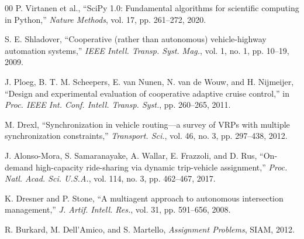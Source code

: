 \documentclass[conference]{IEEEtran}
\begin{document}
\begin{thebibliography}{00}
 P. Virtanen et al., ``SciPy 1.0: Fundamental algorithms for scientific computing in Python,'' \textit{Nature Methods}, vol. 17, pp. 261--272, 2020.

 S. E. Shladover, ``Cooperative (rather than autonomous) vehicle-highway automation systems,'' \textit{IEEE Intell. Transp. Syst. Mag.}, vol. 1, no. 1, pp. 10--19, 2009.

 J. Ploeg, B. T. M. Scheepers, E. van Nunen, N. van de Wouw, and H. Nijmeijer, ``Design and experimental evaluation of cooperative adaptive cruise control,'' in \textit{Proc. IEEE Int. Conf. Intell. Transp. Syst.}, pp. 260--265, 2011.

 M. Drexl, ``Synchronization in vehicle routing---a survey of VRPs with multiple synchronization constraints,'' \textit{Transport. Sci.}, vol. 46, no. 3, pp. 297--438, 2012.

 J. Alonso-Mora, S. Samaranayake, A. Wallar, E. Frazzoli, and D. Rus, ``On-demand high-capacity ride-sharing via dynamic trip-vehicle assignment,'' \textit{Proc. Natl. Acad. Sci. U.S.A.}, vol. 114, no. 3, pp. 462--467, 2017.

 K. Dresner and P. Stone, ``A multiagent approach to autonomous intersection management,'' \textit{J. Artif. Intell. Res.}, vol. 31, pp. 591--656, 2008.

 R. Burkard, M. Dell'Amico, and S. Martello, \textit{Assignment Problems}, SIAM, 2012.
\end{thebibliography}
\end{document}
